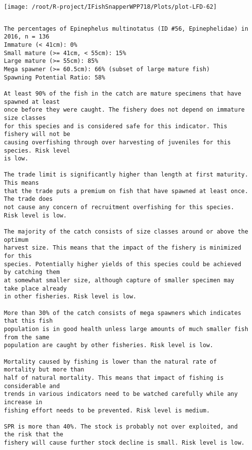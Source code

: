 \documentclass{report}\usepackage[]{graphicx}\usepackage[]{color}
\makeatletter
\def\maxwidth{ %
  \ifdim\Gin@nat@width>\linewidth
    \linewidth
  \else
    \Gin@nat@width
  \fi
}
\newenvironment{kframe}{%
 \def\at@end@of@kframe{}%
 \ifinner\ifhmode%
  \def\at@end@of@kframe{\end{minipage}}%
  \begin{minipage}{\columnwidth}%
 \fi\fi%
 \def\FrameCommand##1{\hskip\@totalleftmargin \hskip-\fboxsep
 \colorbox{shadecolor}{##1}\hskip-\fboxsep
     \hskip-\linewidth \hskip-\@totalleftmargin \hskip\columnwidth}%
 \MakeFramed {\advance\hsize-\width
   \@totalleftmargin\z@ \linewidth\hsize
   \@setminipage}}%
 {\par\unskip\endMakeFramed%
 \at@end@of@kframe}
\newenvironment{knitrout}{}{} %
\makeatother
\begin{document}
\begin{knitrout}
\texttt{[image: /root/R-project/IFishSnapperWPP718/Plots/plot-LFD-62]} 
\begin{kframe}\begin{verbatim}
\end{verbatim}
\end{kframe}
\clearpage
\newpage
\begin{kframe}\begin{verbatim}The percentages of Epinephelus multinotatus (ID #56, Epinephelidae) in 2016, n = 136
Immature (< 41cm): 0%
Small mature (>= 41cm, < 55cm): 15%
Large mature (>= 55cm): 85%
Mega spawner (>= 60.5cm): 66% (subset of large mature fish)
Spawning Potential Ratio: 58%
 
At least 90% of the fish in the catch are mature specimens that have spawned at least
once before they were caught. The fishery does not depend on immature size classes
for this species and is considered safe for this indicator. This fishery will not be
causing overfishing through over harvesting of juveniles for this species. Risk level
is low.

The trade limit is significantly higher than length at first maturity.  This means
that the trade puts a premium on fish that have spawned at least once. The trade does
not cause any concern of recruitment overfishing for this species. Risk level is low.

The majority of the catch consists of size classes around or above the optimum
harvest size. This means that the impact of the fishery is minimized for this
species. Potentially higher yields of this species could be achieved by catching them
at somewhat smaller size, although capture of smaller specimen may take place already
in other fisheries. Risk level is low.

More than 30% of the catch consists of mega spawners which indicates that this fish
population is in good health unless large amounts of much smaller fish from the same
population are caught by other fisheries. Risk level is low.
 
Mortality caused by fishing is lower than the natural rate of mortality but more than
half of natural mortality. This means that impact of fishing is considerable and
trends in various indicators need to be watched carefully while any increase in
fishing effort needs to be prevented. Risk level is medium.
 
SPR is more than 40%. The stock is probably not over exploited, and the risk that the
fishery will cause further stock decline is small. Risk level is low.
 

\end{verbatim}
\end{kframe}
\end{knitrout}
\end{document}
